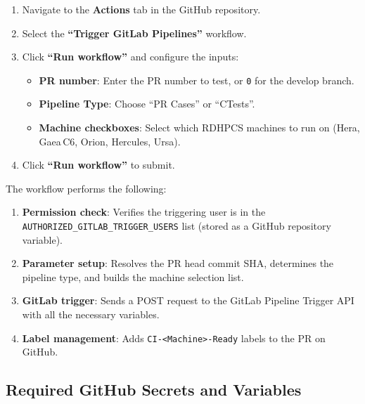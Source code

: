 \documentclass[11pt,letterpaper,twoside]{article}
\begin{document}
\begin{enumerate}[leftmargin=1.5em]
  \item Navigate to the \textbf{Actions} tab in the GitHub repository.
  \item Select the \textbf{``Trigger GitLab Pipelines''} workflow.
  \item Click \textbf{``Run workflow''} and configure the inputs:
    \begin{itemize}[leftmargin=1.5em]
      \item \textbf{PR number}: Enter the PR number to test, or \texttt{0} for
        the develop branch.
      \item \textbf{Pipeline Type}: Choose ``PR Cases'' or ``CTests''.
      \item \textbf{Machine checkboxes}: Select which RDHPCS machines to run on
        (Hera, Gaea\,C6, Orion, Hercules, Ursa).
    \end{itemize}
  \item Click \textbf{``Run workflow''} to submit.
\end{enumerate}

The workflow performs the following:

\begin{enumerate}[leftmargin=1.5em]
  \item \textbf{Permission check}: Verifies the triggering user is in the
    \texttt{AUTHORIZED\_GITLAB\_TRIGGER\_USERS} list (stored as a GitHub
    repository variable).
  \item \textbf{Parameter setup}: Resolves the PR head commit SHA, determines
    the pipeline type, and builds the machine selection list.
  \item \textbf{GitLab trigger}: Sends a POST request to the GitLab Pipeline
    Trigger API with all the necessary variables.
  \item \textbf{Label management}: Adds \texttt{CI-<Machine>-Ready} labels to
    the PR on GitHub.
\end{enumerate}

\subsection{Required GitHub Secrets and Variables}
\label{sec:github-secrets}
\end{document}

